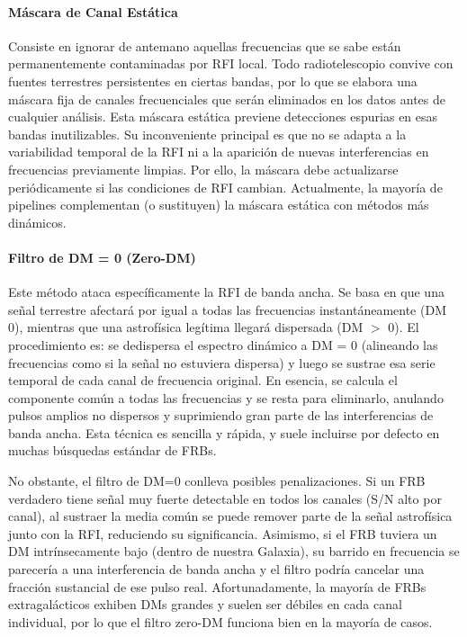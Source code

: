 \paragraph{Máscara de Canal Estática}

Consiste en ignorar de antemano aquellas frecuencias que se sabe están permanentemente contaminadas por RFI local. Todo radiotelescopio convive con fuentes terrestres persistentes en ciertas bandas, por lo que se elabora una máscara fija de canales frecuenciales que serán eliminados en los datos antes de cualquier análisis. Esta máscara estática previene detecciones espurias en esas bandas inutilizables. Su inconveniente principal es que no se adapta a la variabilidad temporal de la RFI ni a la aparición de nuevas interferencias en frecuencias previamente limpias. Por ello, la máscara debe actualizarse periódicamente si las condiciones de RFI cambian. Actualmente, la mayoría de pipelines complementan (o sustituyen) la máscara estática con métodos más dinámicos.

\paragraph{Filtro de DM = 0 (Zero-DM)}

Este método ataca específicamente la RFI de banda ancha. Se basa en que una señal terrestre afectará por igual a todas las frecuencias instantáneamente (DM 0), mientras que una astrofísica legítima llegará dispersada (DM $>$ 0). El procedimiento es: se dedispersa el espectro dinámico a DM = 0 (alineando las frecuencias como si la señal no estuviera dispersa) y luego se sustrae esa serie temporal de cada canal de frecuencia original. En esencia, se calcula el componente común a todas las frecuencias y se resta para eliminarlo, anulando pulsos amplios no dispersos y suprimiendo gran parte de las interferencias de banda ancha. Esta técnica es sencilla y rápida, y suele incluirse por defecto en muchas búsquedas estándar de FRBs.

No obstante, el filtro de DM=0 conlleva posibles penalizaciones. Si un FRB verdadero tiene señal muy fuerte detectable en todos los canales (S/N alto por canal), al sustraer la media común se puede remover parte de la señal astrofísica junto con la RFI, reduciendo su significancia. Asimismo, si el FRB tuviera un DM intrínsecamente bajo (dentro de nuestra Galaxia), su barrido en frecuencia se parecería a una interferencia de banda ancha y el filtro podría cancelar una fracción sustancial de ese pulso real. Afortunadamente, la mayoría de FRBs extragalácticos exhiben DMs grandes y suelen ser débiles en cada canal individual, por lo que el filtro zero-DM funciona bien en la mayoría de casos.


